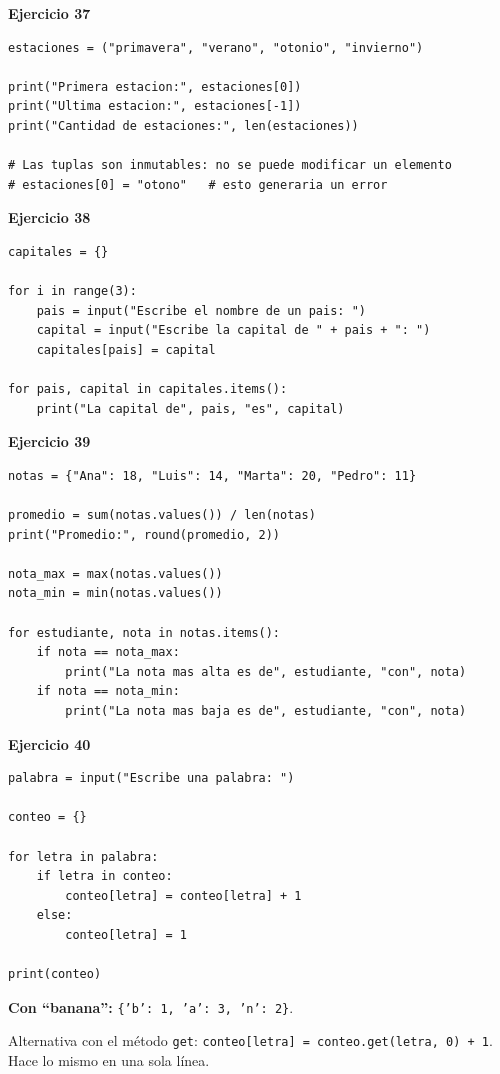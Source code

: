 \documentclass[12pt,a4paper]{article}
\begin{document}
\begin{cajaSolucion}
\textbf{Ejercicio 37}
\begin{lstlisting}[style=pythonStyle]
estaciones = ("primavera", "verano", "otonio", "invierno")

print("Primera estacion:", estaciones[0])
print("Ultima estacion:", estaciones[-1])
print("Cantidad de estaciones:", len(estaciones))

# Las tuplas son inmutables: no se puede modificar un elemento
# estaciones[0] = "otono"   # esto generaria un error
\end{lstlisting}
\end{cajaSolucion}

\begin{cajaSolucion}
\textbf{Ejercicio 38}
\begin{lstlisting}[style=pythonStyle]
capitales = {}

for i in range(3):
    pais = input("Escribe el nombre de un pais: ")
    capital = input("Escribe la capital de " + pais + ": ")
    capitales[pais] = capital

for pais, capital in capitales.items():
    print("La capital de", pais, "es", capital)
\end{lstlisting}
\end{cajaSolucion}

\begin{cajaSolucion}
\textbf{Ejercicio 39}
\begin{lstlisting}[style=pythonStyle]
notas = {"Ana": 18, "Luis": 14, "Marta": 20, "Pedro": 11}

promedio = sum(notas.values()) / len(notas)
print("Promedio:", round(promedio, 2))

nota_max = max(notas.values())
nota_min = min(notas.values())

for estudiante, nota in notas.items():
    if nota == nota_max:
        print("La nota mas alta es de", estudiante, "con", nota)
    if nota == nota_min:
        print("La nota mas baja es de", estudiante, "con", nota)
\end{lstlisting}
\end{cajaSolucion}

\begin{cajaSolucion}
\textbf{Ejercicio 40}
\begin{lstlisting}[style=pythonStyle]
palabra = input("Escribe una palabra: ")

conteo = {}

for letra in palabra:
    if letra in conteo:
        conteo[letra] = conteo[letra] + 1
    else:
        conteo[letra] = 1

print(conteo)
\end{lstlisting}

\textbf{Con ``banana'':} \texttt{\{'b': 1, 'a': 3, 'n': 2\}}.

\begin{cajaNota}
Alternativa con el método \texttt{get}: \texttt{conteo[letra] = conteo.get(letra, 0) + 1}. Hace lo mismo en una sola línea.
\end{cajaNota}
\end{cajaSolucion}
\end{document}
